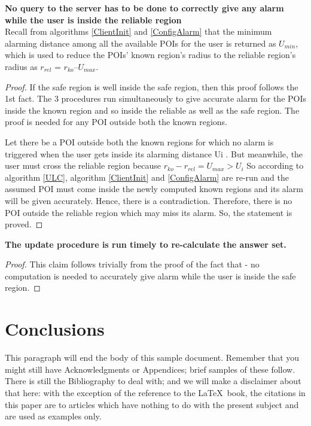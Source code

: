 \documentclass{sig-alternate}
\begin{document}
\textbf{No query to the server has to be done to correctly give any alarm while the user is inside the reliable region}\\
Recall from algorithms \ref{ClientInit} and \ref{ConfigAlarm} that the minimum alarming distance among all the available POIs for the user is returned as $U_{min}$, which is used to reduce the POIs' known region's radius to the reliable region's radius as $r_{rel}$ = $r_{ko} – U_{max}$.

\begin{proof}
If the safe region is well inside the safe region, then this proof follows the 1st fact.
The 3 procedures run simultaneously to give accurate alarm for the POIs inside the known region and so inside the reliable as well as the safe region.
The proof is needed for any POI outside both the known regions.

Let there be a POI outside both the known regions for which no alarm is triggered when the user gets inside its alarming distance Ui . 
But meanwhile, the user must cross the reliable region because $r_{ko} - r_{rel} = U_{max} > U_i$ 
So according to algorithm \ref{ULC}, algorithm \ref{ClientInit} and \ref{ConfigAlarm} are re-run and the assumed POI must come inside the newly computed known regions and its alarm will be given accurately.
Hence, there is a contradiction.
Therefore, there is no POI outside the reliable region which may miss its alarm.
So, the statement is proved.
\end{proof}

\textbf{The update procedure is run timely to re-calculate the answer set.}
\begin{proof} 
This claim follows trivially from the proof of the fact that - no computation is needed to accurately give alarm while the user is inside the safe region.
\end{proof}


\section{Conclusions}
This paragraph will end the body of this sample document.
Remember that you might still have Acknowledgments or
Appendices; brief samples of these
follow.  There is still the Bibliography to deal with; and
we will make a disclaimer about that here: with the exception
of the reference to the \LaTeX\ book, the citations in
this paper are to articles which have nothing to
do with the present subject and are used as
examples only.
\end{document}
